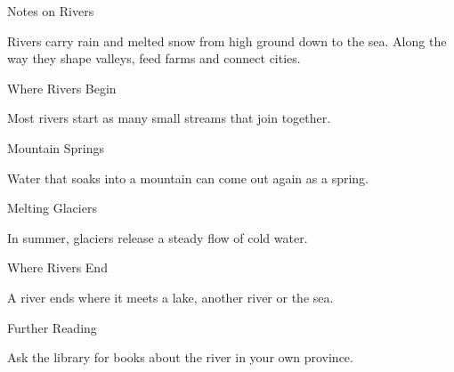 \documentclass{article}
\begin{document}
Notes on Rivers

Rivers carry rain and melted snow from high ground down to the sea.
Along the way they shape valleys, feed farms and connect cities.

Where Rivers Begin

Most rivers start as many small streams that join together.

Mountain Springs

Water that soaks into a mountain can come out again as a spring.

Melting Glaciers

In summer, glaciers release a steady flow of cold water.

Where Rivers End

A river ends where it meets a lake, another river or the sea.

Further Reading

Ask the library for books about the river in your own province.
\end{document}
